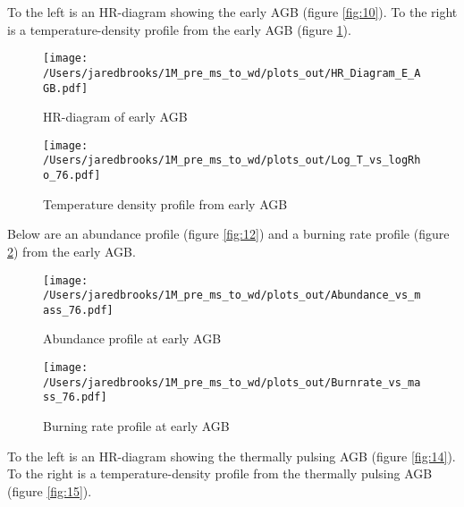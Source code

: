 \documentclass{article}
\begin{document}
        \pagebreak

        To the left is an HR-diagram showing the early AGB (figure \ref{fig:10}).  To the right is a temperature-density profile from the early AGB (figure \ref{fig:11}).

        \begin{figure}[H]
          \begin{minipage}[b]{0.5\linewidth}
            \centering
            \texttt{[image: /Users/jaredbrooks/1M\_pre\_ms\_to\_wd/plots\_out/HR\_Diagram\_E\_AGB.pdf]}
            \caption{HR-diagram of early AGB}
            \label{fig:10}
          \end{minipage}
          \hspace{0cm}
          \begin{minipage}[b]{0.5\linewidth}
            \centering
            \texttt{[image: /Users/jaredbrooks/1M\_pre\_ms\_to\_wd/plots\_out/Log\_T\_vs\_logRho\_76.pdf]}
            \caption{Temperature density profile from early AGB}
            \label{fig:11}
          \end{minipage}
        \end{figure}

        Below are an abundance profile (figure \ref{fig:12}) and a burning rate profile (figure \ref{fig:13}) from the early AGB.

        \begin{figure}[H]
          \begin{minipage}[b]{0.5\linewidth}
            \centering
            \texttt{[image: /Users/jaredbrooks/1M\_pre\_ms\_to\_wd/plots\_out/Abundance\_vs\_mass\_76.pdf]}
            \caption{Abundance profile at early AGB}
            \label{fig:12}
          \end{minipage}
          \hspace{0cm}
          \begin{minipage}[b]{0.5\linewidth}
            \centering
            \texttt{[image: /Users/jaredbrooks/1M\_pre\_ms\_to\_wd/plots\_out/Burnrate\_vs\_mass\_76.pdf]}
            \caption{Burning rate profile at early AGB}
            \label{fig:13}
          \end{minipage}
        \end{figure}

        \pagebreak

        To the left is an HR-diagram showing the thermally pulsing AGB (figure \ref{fig:14}).  To the right is a temperature-density profile from the thermally pulsing AGB (figure \ref{fig:15}).
\end{document}
